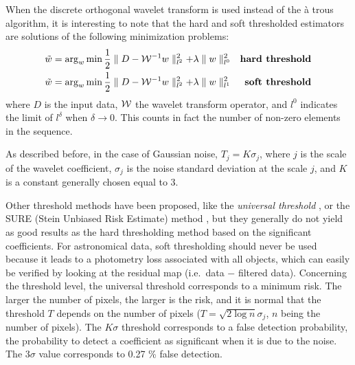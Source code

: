 When the discrete orthogonal wavelet transform is used instead of the \`a trous algorithm, it is interesting to note
that the hard and soft thresholded estimators are solutions of the following minimization problems:
\begin{eqnarray*}
  \tilde w  =   \mathrm{arg}_w \min {1 \over 2} \parallel D - {\cal W}^{-1} w \parallel^2_{l^2} + 
 \lambda \parallel w \parallel^2_{l^0} & & \mbox{\bf   hard threshold} \nonumber \\
  \tilde w   =   \mathrm{arg}_w \min {1 \over 2} \parallel D - {\cal W}^{-1} w \parallel^2_{l^2} + 
 \lambda \parallel w \parallel^2_{l^1} & & \mbox{\bf   soft threshold}  
\end{eqnarray*}
where $D$ is the input data, ${\cal W}$ the wavelet transform operator, and $l^0$ indicates the limit of $l^\delta$ 
when $\delta \rightarrow 0$. This counts in fact the number of non-zero elements in the sequence.

As described before, in the case of Gaussian noise, $T_j = K \sigma_j$, where $j$ is the scale of the wavelet coefficient, 
$\sigma_j$ is the noise standard deviation at the scale $j$, and $K$ is a constant generally chosen equal to 3.

Other threshold methods have been proposed, like the {\em universal threshold} 
\cite{rest:donoho93_1,rest:donoho93_2}, or the SURE (Stein Unbiased Risk Estimate) method \cite{rest:donoho95},
but they generally do not yield as good results as the hard thresholding method based on the significant coefficients.  
For astronomical data, soft thresholding should never be used because it leads to a photometry loss associated with all 
objects, which can easily be verified by looking at the residual map (i.e.\ data $-$ filtered data). Concerning the 
threshold level, the universal threshold  corresponds to a minimum risk. The larger the number of pixels, the larger 
is the risk, and it is normal that the threshold $T$ depends on the number of pixels ($T = \sqrt{2\log n} \sigma_j$, 
$n$ being the number of pixels). The $K\sigma$ threshold corresponds to a false detection probability, the probability 
to detect a coefficient as significant when it is due to the noise. The $3\sigma$ value corresponds to 0.27 \% false detection.
 
